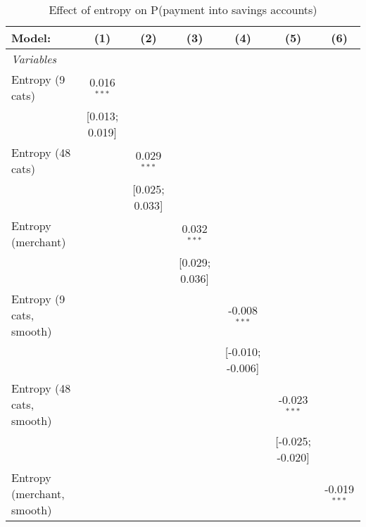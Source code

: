 
\begin{table}[htbp]
   \centering
   \tiny
   \begin{threeparttable}[b]
      \caption{\label{tab:reg_has_inflows_main} Effect of entropy on P(payment into savings accounts)}
      \begin{tabular}{lcccccc}
         \tabularnewline \midrule \midrule
         Model:                     & (1)             & (2)             & (3)             & (4)              & (5)              & (6)\\  
         \midrule
         \emph{Variables}\\
         Entropy (9 cats)           & 0.016$^{***}$   &                 &                 &                  &                  &   \\   
                                    & [0.013; 0.019]  &                 &                 &                  &                  &   \\   
         Entropy (48 cats)          &                 & 0.029$^{***}$   &                 &                  &                  &   \\   
                                    &                 & [0.025; 0.033]  &                 &                  &                  &   \\   
         Entropy (merchant)         &                 &                 & 0.032$^{***}$   &                  &                  &   \\   
                                    &                 &                 & [0.029; 0.036]  &                  &                  &   \\   
         Entropy (9 cats, smooth)   &                 &                 &                 & -0.008$^{***}$   &                  &   \\   
                                    &                 &                 &                 & [-0.010; -0.006] &                  &   \\   
         Entropy (48 cats, smooth)  &                 &                 &                 &                  & -0.023$^{***}$   &   \\   
                                    &                 &                 &                 &                  & [-0.025; -0.020] &   \\   
         Entropy (merchant, smooth) &                 &                 &                 &                  &                  & -0.019$^{***}$\\   

\end{tabular}
\end{threeparttable}
\end{table}
